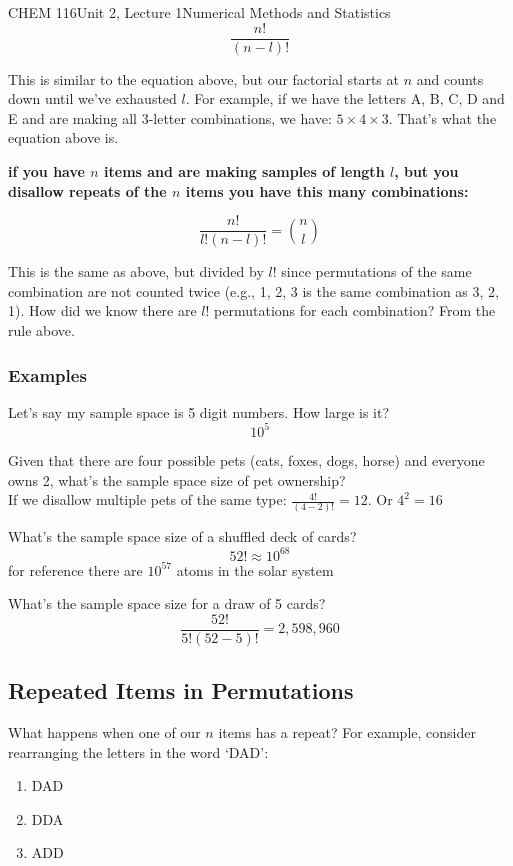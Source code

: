 \documentclass{article}
\begin{document}
\begin{tdoc}{CHEM 116}{Unit 2, Lecture 1}{Numerical Methods and Statistics}
  $$  \frac{n!}{(n - l)!}$$

  This is similar to the equation above, but our factorial starts at
  $n$ and counts down until we've exhausted $l$. For example, if we
  have the letters A, B, C, D and E and are making all 3-letter
  combinations, we have: $5 \times 4 \times 3$. That's what the
  equation above is.

  {\bf if you have $n$ items and are making samples of length $l$, but you disallow repeats of the $n$ items you have this many combinations:}

  $$  \frac{n!}{l!(n - l)!} = \binom{n}{l}$$

  This is the same as above, but divided by $l!$ since permutations of
  the same combination are not counted twice (e.g., 1, 2, 3 is the
  same combination as 3, 2, 1). How did we know there are $l!$
  permutations for each combination? From the rule above.

  \subsubsection{Examples}

  Let's say my sample space is 5 digit numbers. How large is it?\\
  $$10^5$$

  Given that there are four possible pets (cats, foxes, dogs, horse)
  and everyone owns 2, what's the sample space size of pet
  ownership?\\ If we disallow multiple pets of the same type:
  $\frac{4!}{(4 - 2)!} = 12$. Or $4^2 = 16$

  What's the sample space size of a shuffled deck of cards?\\
  $$52! \approx 10^{68}$$
  for reference there are $10^{57}$ atoms in the solar system

  What's the sample space size for a draw of 5 cards?\\
  $$\frac{52!}{5!(52 - 5)!} = 2,598,960$$

\subsection{Repeated Items in Permutations}

What happens when one of our $n$ items has a repeat? For example, consider rearranging
the letters in the word `DAD':

\begin{enumerate}
\item DAD
\item DDA
\item ADD
\end{enumerate}


\end{tdoc}
\end{document}
